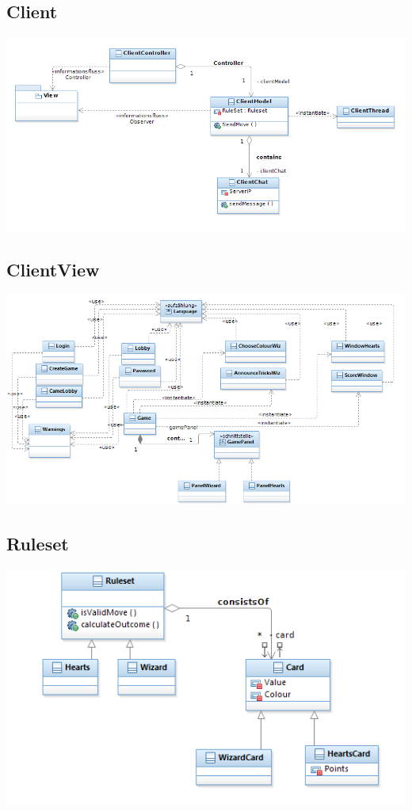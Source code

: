 \documentclass{article}
\begin{document}
\subsection{Client}
\includegraphics[width=\textwidth]{Client}
\subsection{ClientView}
\includegraphics[width=\textwidth]{ClientView}
\subsection{Ruleset}
\includegraphics[width=\textwidth]{Ruleset}
\end{document}
